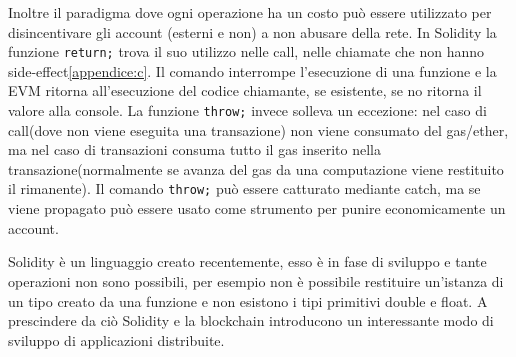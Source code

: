 		Inoltre il paradigma dove ogni operazione ha un costo può essere utilizzato per disincentivare gli account (esterni e non) a non abusare della rete. In Solidity la funzione \lstinline|return;| trova il suo utilizzo nelle call, nelle chiamate che non hanno side-effect\ref{appendice:c}. Il comando interrompe l'esecuzione di una funzione e la EVM ritorna all'esecuzione del codice chiamante, se esistente, se no ritorna il valore alla console. La funzione \lstinline|throw;| invece solleva un eccezione: nel caso di call(dove non viene eseguita una transazione) non viene consumato del gas/ether, ma nel caso di transazioni consuma tutto il gas inserito nella transazione(normalmente se avanza del gas da una computazione viene restituito il rimanente). Il comando \lstinline|throw;| può essere catturato mediante catch, ma se viene propagato può essere usato come strumento per punire economicamente un account.
		
		Solidity è un linguaggio creato recentemente, esso è in fase di sviluppo e tante operazioni non sono possibili, per esempio non è possibile restituire un'istanza di un tipo creato da una funzione e non esistono i tipi primitivi double e float.
		A prescindere da ciò Solidity e la blockchain introducono un interessante modo di sviluppo di applicazioni distribuite. 
		
